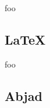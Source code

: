 foo

\subsection{LaTeX}

foo

\begin{singlespacing}
\vspace{-0.5\baselineskip}
\begin{multicols}{2}

\vfill
\columnbreak
\setlength\fboxsep{0pt}
\setlength\fboxrule{0.5pt}
\noindent{}
\end{multicols}
\end{singlespacing}

\subsection{Abjad}

